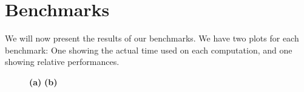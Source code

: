 \section{Benchmarks}
We will now present the results of our benchmarks. We have two plots
for each benchmark: One showing the actual time used on each
computation, and one showing relative performances.

\begin{figure}
	\centering
\begin{adjustbox}{minipage=1.3\textwidth,margin=0pt \smallskipamount,center}
\end{adjustbox}
  \caption{\textbf{(a)}  \textbf{(b)} }
\label{fig:binomial-cpu}
\end{figure}

